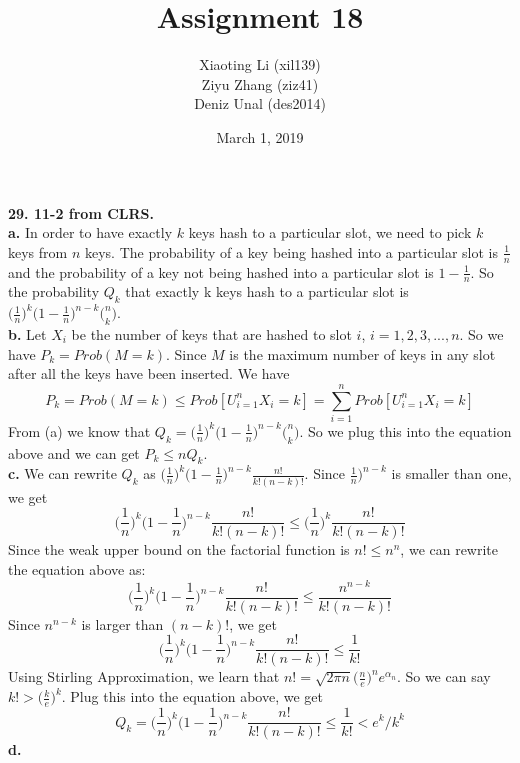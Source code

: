 \documentclass{article}
\title{Assignment 18}
\author{Xiaoting Li (xil139) \\
Ziyu Zhang (ziz41) \\
Deniz Unal (des2014)}
\date{March 1, 2019}
\begin{document}
\maketitle

\noindent
\textbf{29. 11-2 from CLRS.}\\ \newline
\textbf{a.} In order to have exactly $k$ keys hash to a particular slot, we need to pick $k$ keys from $n$ keys. The probability of a key being hashed into a particular slot is $\frac{1}{n}$ and the probability of a key not being hashed into a particular slot is $1 - \frac{1}{n}$. So the probability $Q_k$ that exactly k keys hash to a particular slot is $\big(\frac{1}{n})^k\big(1 - \frac{1}{n})^{n-k}\big(_k^n)$. \\ \newline 
\textbf{b.} Let $X_i$ be the number of keys that are hashed to slot $i$, $i = 1, 2, 3, ..., n$. So we have $P_k = Prob(M = k)$. Since $M$ is the maximum number of keys in any slot after all the keys have been inserted. We have $$P_k = Prob(M = k) \leq Prob[U_{i=1}^{n}X_i = k] = \sum_{i=1}^{n}Prob[U_{i=1}^{n}X_i = k]$$
From (a) we know that $Q_k = \big(\frac{1}{n})^k\big(1 - \frac{1}{n})^{n-k}\big(_k^n)$. So we plug this into the equation above and we can get $P_k \leq nQ_k$. \\ \newline
\textbf{c.} We can rewrite $Q_k$ as $\big(\frac{1}{n})^k\big(1 - \frac{1}{n})^{n-k}\frac{n!}{k!(n-k)!}$. Since $\frac{1}{n})^{n-k}$ is smaller than one, we get $$\big(\frac{1}{n})^k\big(1 - \frac{1}{n})^{n-k}\frac{n!}{k!(n-k)!} \leq \big(\frac{1}{n})^k \frac{n!}{k!(n-k)!}$$
Since the weak upper bound on the factorial function is $n! \leq n^n$, we can rewrite the equation above as: $$\big(\frac{1}{n})^k\big(1 - \frac{1}{n})^{n-k}\frac{n!}{k!(n-k)!} \leq \frac{n^{n-k}}{k!(n - k)!}$$
Since $n^{n-k}$ is larger than $(n - k)!$, we get $$\big(\frac{1}{n})^k\big(1 - \frac{1}{n})^{n-k}\frac{n!}{k!(n-k)!} \leq \frac{1}{k!}$$
Using Stirling Approximation, we learn that $n! = \sqrt{2\pi n}\big(\frac{n}{e})^n e^{\alpha_n}$. So we can say $k! > \big(\frac{k}{e})^k$. Plug this into the equation above, we get 
$$Q_k = \big(\frac{1}{n})^k\big(1 - \frac{1}{n})^{n-k}\frac{n!}{k!(n-k)!} \leq \frac{1}{k!} < e^k/k^k$$
\textbf{d.}
\end{document}
